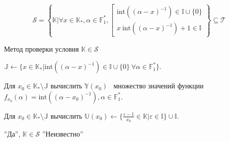 \documentclass[8pt, xcolor=x11names]{beamer}
\begin{document}
\begin{frame}
    \begin{block}{\vspace*{-3ex}}
        $$
        \mathcal{S} = \left\{
            \mathbb{K} \Big| \forall x\in\mathbb{K}_*, \alpha\in\mathbb{F}_{1}^{*}, \left[
                \begin{array}{l}
                    \textrm{int}((\alpha-x)^{-1})\in\mathbb{I}\cup\{0\}\\
                    x \ \textrm{int}((\alpha-x)^{-1})+1\in\mathbb{I}
                \end{array}
            \right.
        \right\} \subseteq \mathcal{T}
        $$
    \end{block}

    \begin{block}{Метод проверки условия $\mathbb{K}\in\mathcal{S}$}
        \begin{algorithmic}[1]
            \State $\mathbb{J} \gets \{x\in\mathbb{K}_{*}|\textrm{int}((\alpha-x)^{-1})\in\mathbb{I}\cup\{0\} \ \forall\alpha\in\mathbb{F}_{1}^{*}\}$.
    
            \State Для $x_0\in\mathbb{K}_*\setminus\mathbb{J}$ вычислить $\mathbb{Y}(x_{0})$ \textendash\ множество значений функции $f_{x_{0}}(\alpha)=\textrm{int}((\alpha-x_{0})^{-1}), \alpha\in\mathbb{F}_{1}^{*}$.
    
            \State Для $x_0\in\mathbb{K}_*\setminus\mathbb{J}$ вычислить $\mathbb{U}(x_{0}) \gets \{\frac{\varepsilon-1}{x_{0}}\in\mathbb{K}|\varepsilon\in\mathbb{I}\}\cup\mathbb{I}$.
    
                \State\Return ''Да'', $\mathbb{K}\in\mathcal{S}$
            \Else
                \State\Return ''Неизвестно''
            \EndIf
        \end{algorithmic}
    \end{block}
\end{frame}
\end{document}
